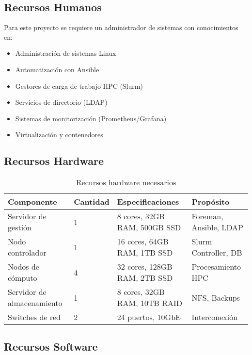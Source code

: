 \documentclass[12pt,a4paper]{report}
\begin{document}
\subsection{Recursos Humanos}

Para este proyecto se requiere un administrador de sistemas con conocimientos en:
\begin{itemize}
    \item Administración de sistemas Linux
    \item Automatización con Ansible
    \item Gestores de carga de trabajo HPC (Slurm)
    \item Servicios de directorio (LDAP)
    \item Sistemas de monitorización (Prometheus/Grafana)
    \item Virtualización y contenedores
\end{itemize}

\subsection{Recursos Hardware}

\begin{table}[H]
\centering
\begin{tabular}{|l|l|l|l|}
\hline
\textbf{Componente} & \textbf{Cantidad} & \textbf{Especificaciones} & \textbf{Propósito} \\
\hline
Servidor de gestión & 1 & 8 cores, 32GB RAM, 500GB SSD & Foreman, Ansible, LDAP \\
\hline
Nodo controlador & 1 & 16 cores, 64GB RAM, 1TB SSD & Slurm Controller, DB \\
\hline
Nodos de cómputo & 4 & 32 cores, 128GB RAM, 2TB SSD & Procesamiento HPC \\
\hline
Servidor de almacenamiento & 1 & 8 cores, 32GB RAM, 10TB RAID & NFS, Backups \\
\hline
Switches de red & 2 & 24 puertos, 10GbE & Interconexión \\
\hline
\end{tabular}
\caption{Recursos hardware necesarios}
\label{tab:hardware}
\end{table}

\subsection{Recursos Software}
\end{document}
